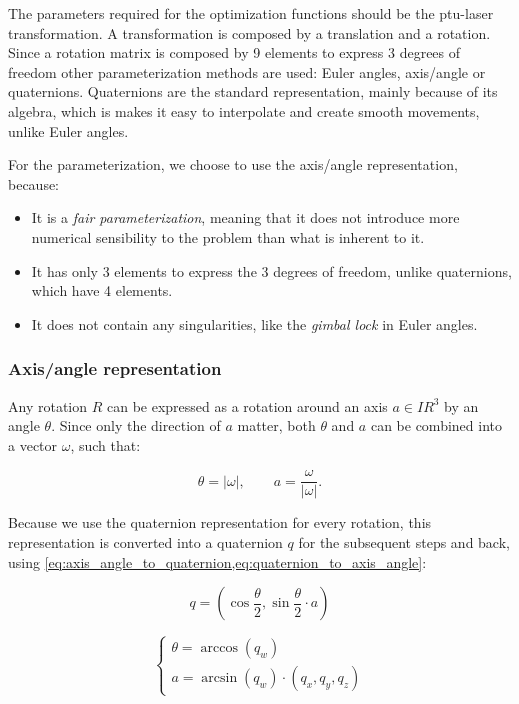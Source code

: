 The parameters required for the optimization functions should be the ptu-laser transformation. A transformation is composed by a translation and a rotation. Since a rotation matrix is composed by 9 elements to express 3 degrees of freedom other parameterization methods are used: Euler angles, axis/angle or quaternions. Quaternions are the standard representation, mainly because of its algebra, which is makes it easy to interpolate and create smooth movements, unlike Euler angles.

For the parameterization, we choose to use the axis/angle representation, because:

\begin{itemize}
    \item It is a \textit{fair parameterization}, meaning that it does not introduce more numerical sensibility to the problem than what is inherent to it.
    \item It has only 3 elements to express the 3 degrees of freedom, unlike quaternions, which have 4 elements.
    \item It does not contain any singularities, like the \textit{gimbal lock} in Euler angles.
\end{itemize}

\subsubsection{Axis/angle representation}

Any rotation $R$ can be expressed as a rotation around an axis $a \in I\!R^3$ by an angle $\theta$. Since only the direction of $a$ matter, both $\theta$ and $a$ can be combined into a vector $\omega$, such that:

\begin{equation}
    \theta = |\omega|, \qquad a = \frac{\omega}{|\omega|} .
\end{equation}

Because we use the quaternion representation for every rotation, this representation is converted into a quaternion $q$ for the subsequent steps and back, using \cref{eq:axis_angle_to_quaternion,eq:quaternion_to_axis_angle}:

\begin{equation}\label{eq:axis_angle_to_quaternion}
    q = (\cos \frac{\theta}{2}, \sin \frac{\theta}{2} \cdot a)
\end{equation}

\begin{equation}\label{eq:quaternion_to_axis_angle}
    \begin{cases}
        \theta = \arccos(q_w) \\
        a = \arcsin(q_w) \cdot (q_x, q_y, q_z)
    \end{cases}
\end{equation}

